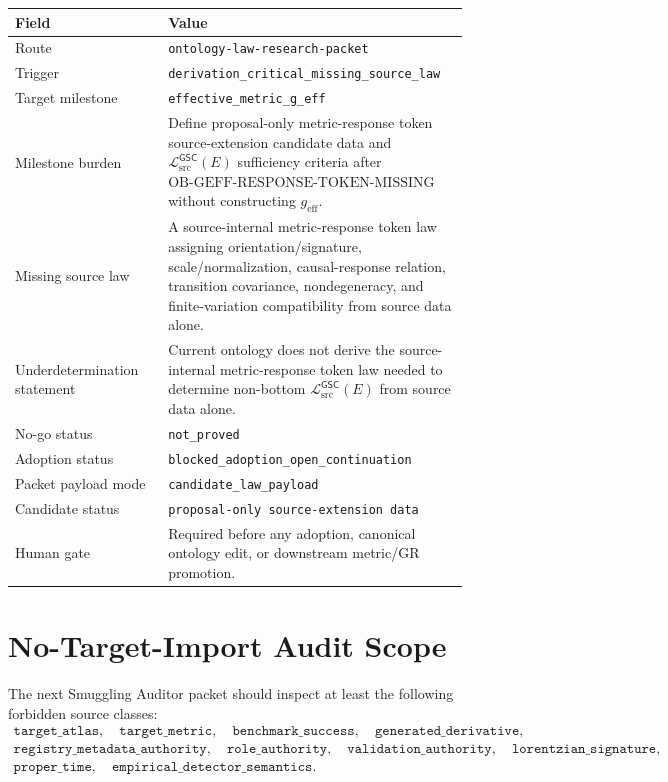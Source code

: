 \documentclass[11pt]{article}
\newcommand{\MetricData}{\mathcal{L}_{\mathrm{src}}^{\mathsf{GSC}}}
\newcommand{\geff}{g_{\mathrm{eff}}}
\begin{document}
\begin{longtable}{p{0.32\linewidth}p{0.58\linewidth}}
\toprule
Field & Value \\
\midrule
Route & \texttt{ontology-law-research-packet} \\
Trigger & \texttt{derivation\_critical\_missing\_source\_law} \\
Target milestone & \texttt{effective\_metric\_g\_eff} \\
Milestone burden & Define proposal-only metric-response token
source-extension candidate data and \(\MetricData(E)\) sufficiency criteria
after \(\mathrm{OB\mbox{-}GEFF\mbox{-}RESPONSE\mbox{-}TOKEN\mbox{-}MISSING}\)
without constructing \(\geff\). \\
Missing source law & A source-internal metric-response token law assigning
orientation/signature, scale/normalization, causal-response relation,
transition covariance, nondegeneracy, and finite-variation compatibility from
source data alone. \\
Underdetermination statement & Current ontology does not derive the
source-internal metric-response token law needed to determine non-bottom
\(\MetricData(E)\) from source data alone. \\
No-go status & \texttt{not\_proved} \\
Adoption status & \texttt{blocked\_adoption\_open\_continuation} \\
Packet payload mode & \texttt{candidate\_law\_payload} \\
Candidate status & \texttt{proposal-only source-extension data} \\
Human gate & Required before any adoption, canonical ontology edit, or
downstream metric/GR promotion. \\
\bottomrule
\end{longtable}

\section{No-Target-Import Audit Scope}

The next Smuggling Auditor packet should inspect at least the following
forbidden source classes:
\[
\begin{gathered}
\texttt{target\_atlas},\quad
\texttt{target\_metric},\quad
\texttt{benchmark\_success},\quad
\texttt{generated\_derivative},\\
\texttt{registry\_metadata\_authority},\quad
\texttt{role\_authority},\quad
\texttt{validation\_authority},\quad
\texttt{lorentzian\_signature},\\
\texttt{proper\_time},\quad
\texttt{empirical\_detector\_semantics}.
\end{gathered}
\]
\end{document}
